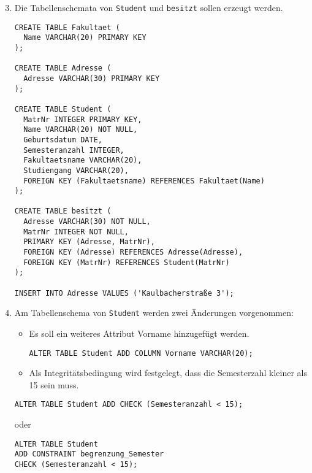 \documentclass{bschlangaul-aufgabe}
\begin{document}
\begin{enumerate}
\setcounter{enumi}{2}

\item Die Tabellenschemata von \texttt{Student} und \texttt{besitzt}
sollen erzeugt werden.

\begin{liAntwort}
\begin{verbatim}
CREATE TABLE Fakultaet (
  Name VARCHAR(20) PRIMARY KEY
);

CREATE TABLE Adresse (
  Adresse VARCHAR(30) PRIMARY KEY
);

CREATE TABLE Student (
  MatrNr INTEGER PRIMARY KEY,
  Name VARCHAR(20) NOT NULL,
  Geburtsdatum DATE,
  Semesteranzahl INTEGER,
  Fakultaetsname VARCHAR(20),
  Studiengang VARCHAR(20),
  FOREIGN KEY (Fakultaetsname) REFERENCES Fakultaet(Name)
);

CREATE TABLE besitzt (
  Adresse VARCHAR(30) NOT NULL,
  MatrNr INTEGER NOT NULL,
  PRIMARY KEY (Adresse, MatrNr),
  FOREIGN KEY (Adresse) REFERENCES Adresse(Adresse),
  FOREIGN KEY (MatrNr) REFERENCES Student(MatrNr)
);

INSERT INTO Adresse VALUES ('Kaulbacherstraße 3');

\end{verbatim}
\end{liAntwort}

\item Am Tabellenschema von \texttt{Student} werden zwei Änderungen
vorgenommen:

\begin{itemize}
\item Es soll ein weiteres Attribut Vorname hinzugefügt werden.

\begin{liAntwort}
\begin{verbatim}
ALTER TABLE Student ADD COLUMN Vorname VARCHAR(20);
\end{verbatim}
\end{liAntwort}

\item Als Integritätsbedingung wird festgelegt, dass die Semesterzahl
kleiner als 15 sein muss.
\end{itemize}

\begin{liAntwort}
\begin{verbatim}
ALTER TABLE Student ADD CHECK (Semesteranzahl < 15);
\end{verbatim}

oder

\begin{verbatim}
ALTER TABLE Student
ADD CONSTRAINT begrenzung_Semester
CHECK (Semesteranzahl < 15);
\end{verbatim}
\end{liAntwort}

\end{enumerate}
\end{document}
